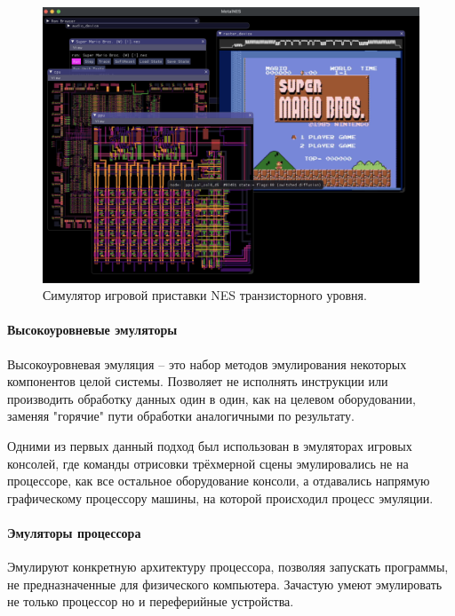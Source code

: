 \begin{figure}[!htbp]
    \centering
    \begin{adjustbox}{max totalsize={0.8\textwidth}{\textheight}}
        \includegraphics[]{images/metal-nes.png}
    \end{adjustbox}
    \caption{Симулятор игровой приставки NES транзисторного уровня.}\label{fig:metal-nes}
\end{figure}

\paragraph{Высокоуровневые эмуляторы}\label{high-level-emu}

Высокоуровневая эмуляция -- это набор методов эмулирования некоторых компонентов целой системы.
Позволяет не исполнять инструкции или производить обработку данных один в один, как на целевом оборудовании,
заменяя "горячие" пути обработки аналогичными по результату.

Одними из первых данный подход был использован в эмуляторах игровых консолей, где команды отрисовки трёхмерной сцены
эмулировались не на процессоре, как все остальное оборудование консоли, а отдавались напрямую
графическому процессору машины, на которой происходил процесс эмуляции.


\paragraph{Эмуляторы процессора}\label{cpu-emu}

Эмулируют конкретную архитектуру процессора, позволяя запускать программы, не предназначенные для физического компьютера.
Зачастую умеют эмулировать не только процессор но и переферийные устройства.


